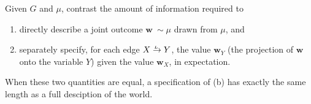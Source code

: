 \documentclass{article}
\theoremstyle{plain}
\theoremstyle{definition}
\theoremstyle{remark}
\newcommand\mat[1]{\mathbf{#1}}
\newcommand{\ed}[3]{#2
  \overset{\smash{\mskip-5mu\raisebox{-1pt}{$\scriptscriptstyle
        #1$}}}{\rightarrow} #3}
\numberwithin{equation}{section}
\begin{document}
Given $G$ and $\mu$, contrast the amount of
information required to 
\begin{enumerate}[label=(\alph*)]
\item directly describe a joint outcome  $\mat w ~ \sim \mu$
          drawn from $\mu$, and 
	\item separately specify, for each edge $\ed LXY$, the value
          $\mat w_Y$ (the projection of $\mat w$ onto the variable
          $Y$) given the value $\mat w_X$, in expectation. 
\end{enumerate}
When these two quantities are equal,
a specification of
(b) has exactly the same length as
a full desciption of the world.
%
%
\end{document}
